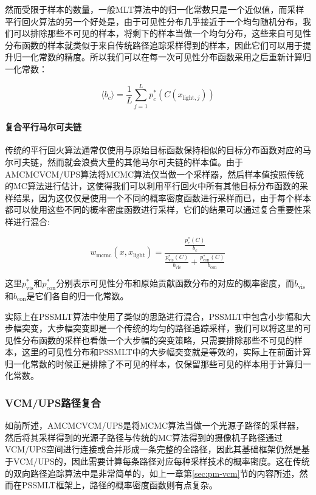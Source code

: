 然而受限于样本的数量，一般MLT算法中的归一化常数只是一个近似值，而采样平行回火算法的另一个好处是，由于可见性分布几乎接近于一个均匀随机分布，我们可以排除那些不可见的样本，将剩下的样本当做一个均匀分布，这些来自可见性分布函数的样本就类似于来自传统路径追踪采样得到的样本，因此它们可以用于提升归一化常数的精度。所以我们可以在每一次可见性分布函数采用之后重新计算归一化常数：

\begin{equation}
	\langle b_c\rangle=\frac{1}{L}\sum^{L}_{j=1}p^{*}_c(C({x}_{\text{light},j}))
\end{equation}




\paragraph{复合平行马尔可夫链}
传统的平行回火算法通常仅使用与原始目标函数保持相似的目标分布函数对应的马尔可夫链，然而就会浪费大量的其他马尔可夫链的样本值。由于AMCMCVCM/UPS算法将MCMC算法仅当做一个采样器，然后样本值按照传统的MC算法进行估计，这使得我们可以利用平行回火中所有其他目标分布函数的采样结果，因为这仅仅是使用一个不同的概率密度函数进行采样而已，由于每个样本都可以使用这些不同的概率密度函数进行采样，它们的结果可以通过复合重要性采样进行混合:

\begin{equation}
	w_{\text{mcmc}}(x,{x}_{\text{light}})=\frac{\frac{p^{*}_c(C)}{b_c}}{\frac{p^{*}_{\text{vis}}(C)}{b_{\text{vis}}}+\frac{p^{*}_{\text{con}}(C)}{b_{\text{con}}}}
\end{equation}

\noindent 这里$p^{*}_{\text{vis}}$和$p^{*}_{\text{con}}$分别表示可见性分布和原始贡献函数分布的对应的概率密度，而$b_{\text{vis}}$和$b_{\text{con}}$是它们各自的归一化常数。

实际上在PSSMLT算法\cite{a:ASimpleandRobustMutationStrategyfortheMetropolisLightTransportAlgorithm}中使用了类似的思路进行混合，PSSMLT中包含小步幅和大步幅突变，大步幅突变即是一个传统的均匀的路径追踪采样，我们可以将这里的可见性分布函数的采样也看做一个大步幅的突变策略，只需要排除那些不可见的样本，这里的可见性分布和PSSMLT中的大步幅突变就是等效的，实际上在前面计算归一化常数的时候正是排除了不可见的样本，仅保留那些可见的样本用于计算归一化常数。




\subsubsection{VCM/UPS路径复合}
如前所述，AMCMCVCM/UPS是将MCMC算法当做一个光源子路径的采样器，然后将其采样得到的光源子路径与传统的MC算法得到的摄像机子路径通过VCM/UPS空间进行连接或合并形成一条完整的全路径，因此其基础框架仍然是基于VCM/UPS的，因此需要计算每条路径对应每种采样技术的概率密度。这在传统的双向路径追踪算法中是非常简单的，如上一章第\ref{sec:pm-vcm}节的内容所述，然而在PSSMLT框架上，路径的概率密度函数则有点复杂。

